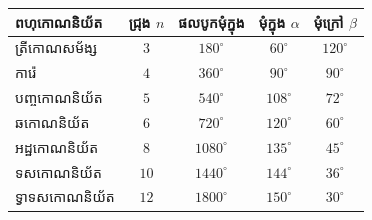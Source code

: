 \documentclass[theme=teal]{khmermath}
\begin{document}
\vspace{2pt}
\noindent
\begin{center}
  \renewcommand{\arraystretch}{1.15}
  \fontsize{8}{8}\selectfont
  \begin{tabular}{|l|c|c|c|c|}
    \hline
    \rowcolor{brandNavy!15}
    \textbf{ពហុកោណនិយ័ត} & \textbf{ជ្រុង $n$} & \textbf{ផលបូកមុំក្នុង} & \textbf{មុំក្នុង $\alpha$} & \textbf{មុំក្រៅ $\beta$} \\
    \hline
    ត្រីកោណសម័ង្ស & $3$ & $180^\circ$ & $60^\circ$ & $120^\circ$ \\
    \hline
    ការ៉េ & $4$ & $360^\circ$ & $90^\circ$ & $90^\circ$ \\
    \hline
    បញ្ចកោណនិយ័ត & $5$ & $540^\circ$ & $108^\circ$ & $72^\circ$ \\
    \hline
    ឆកោណនិយ័ត & $6$ & $720^\circ$ & $120^\circ$ & $60^\circ$ \\
    \hline
    អដ្ឋកោណនិយ័ត & $8$ & $1080^\circ$ & $135^\circ$ & $45^\circ$ \\
    \hline
    ទសកោណនិយ័ត & $10$ & $1440^\circ$ & $144^\circ$ & $36^\circ$ \\
    \hline
    ទ្វាទសកោណនិយ័ត & $12$ & $1800^\circ$ & $150^\circ$ & $30^\circ$ \\
    \hline
  \end{tabular}
\end{center}

\vspace{2pt}
\end{document}
